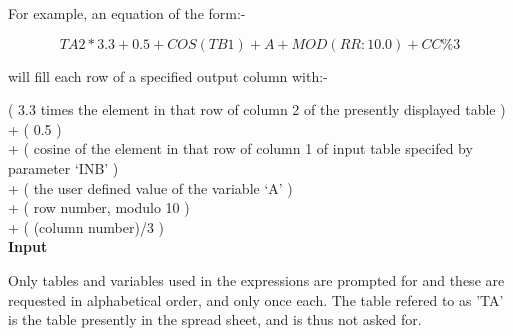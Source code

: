 \begin{small}
{{  For example, an equation of the form:-
                                                                               
 $$        TA2*3.3 + 0.5 + COS(TB1) + A + MOD(RR:10.0) + CC\%3 $$
                                                                               
  will fill each row of a specified output column with:-
                                                                               
 \hspace*{1.0em}( 3.3 times the element in that row of column 2 of the
    presently displayed table ) \hspace*{\fill} \\
  + ( 0.5 ) \hspace*{\fill} \\
  + ( cosine of the element in that row of column 1 of input table 
    specifed by parameter `INB' ) 
   \hspace*{\fill} \\
  + ( the user defined value of the variable `A' ) \hspace*{\fill} \\
  + ( row number, modulo 10 ) \hspace*{\fill} \\
  + ( (column number)/3 ) \hspace*{\fill} \\
 
  {\bf \large Input}
 
  Only tables and variables used in the expressions are prompted for and
  these are requested in alphabetical order, and only once each.
  The table refered to as 'TA' is the table presently in the spread
  sheet, and is thus not asked for.
 
}}
\end{small}

